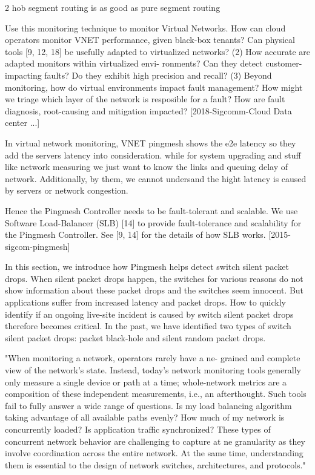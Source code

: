 \documentclass[10pt, journal, letterpaper]{IEEEtran}
\begin{document}
2 hob segment routing is as good as pure segment routing\cite{bhatia2015optimized}

Use this monitoring technique to monitor Virtual Networks. How can cloud operators monitor VNET performance, given black-box tenants? Can physical tools [9, 12, 18] be usefully adapted to virtualized networks?
(2) How accurate are adapted monitors within virtualized envi- ronments? Can they detect customer-impacting faults? Do they exhibit high precision and recall?
(3) Beyond monitoring, how do virtual environments impact fault management? How might we triage which layer of the network is resposible for a fault? How are fault diagnosis, root-causing and mitigation impacted?
[2018-Sigcomm-Cloud Data center ...]

In virtual network monitoring, VNET pingmesh shows the e2e latency so they add the servers latency into consideration. while for system upgrading and stuff like network measuring we just want to know the links and queuing delay of network. Additionally, by them, we cannot undersand the hight latency is caused by servers or network congestion.

Hence the Pingmesh Controller needs to be fault-tolerant and scalable. We use Software Load-Balancer (SLB) [14] to provide fault-tolerance and scalability for the Pingmesh Controller. See [9, 14] for the details of how SLB works. [2015-sigcom-pingmesh]

In this section, we introduce how Pingmesh helps detect switch silent packet drops. When silent packet drops happen, the switches for various reasons do not show information about these packet drops and the switches seem innocent. But applications suffer from increased latency and packet drops. How to quickly identify if an ongoing live-site incident is caused by switch silent packet drops therefore becomes critical. In the past, we have identified two types of switch silent packet drops: packet black-hole and silent random packet drops.

\cite{yaseen2018synchronized} "When monitoring a network, operators rarely have a  ne- grained and complete view of the network’s state. Instead, today’s network monitoring tools generally only measure a single device or path at a time; whole-network metrics are a composition of these independent measurements, i.e., an afterthought. Such tools fail to fully answer a wide range of questions. Is my load balancing algorithm taking advantage of all available paths evenly? How much of my network is concurrently loaded? Is application traffic synchronized? These types of concurrent network behavior are challenging to capture at  ne granularity as they involve coordination across the entire network. At the same time, understanding them is essential to the design of network switches, architectures, and protocols."\cite{yaseen2018synchronized}

	

\end{document}
